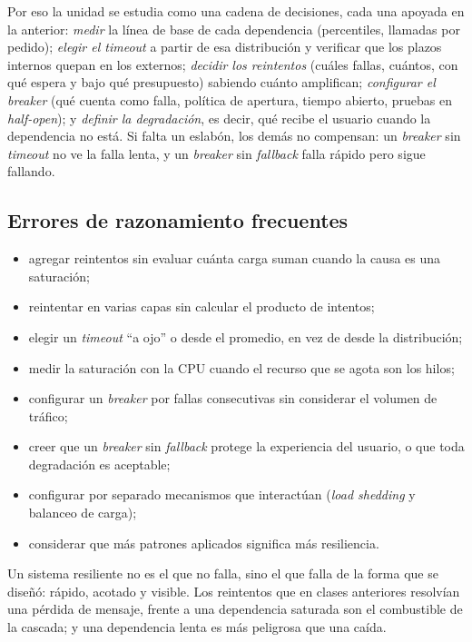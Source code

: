 \documentclass[variant=apuntes,cover=institutional,mode=screen]{ua-engineering-v6-article}
\begin{document}
Por eso la unidad se estudia como una cadena de decisiones, cada una apoyada en la anterior: \emph{medir} la línea de base de cada dependencia (percentiles, llamadas por pedido); \emph{elegir el timeout} a partir de esa distribución y verificar que los plazos internos quepan en los externos; \emph{decidir los reintentos} (cuáles fallas, cuántos, con qué espera y bajo qué presupuesto) sabiendo cuánto amplifican; \emph{configurar el breaker} (qué cuenta como falla, política de apertura, tiempo abierto, pruebas en \emph{half-open}); y \emph{definir la degradación}, es decir, qué recibe el usuario cuando la dependencia no está. Si falta un eslabón, los demás no compensan: un \emph{breaker} sin \emph{timeout} no ve la falla lenta, y un \emph{breaker} sin \emph{fallback} falla rápido pero sigue fallando.

\subsection*{Errores de razonamiento frecuentes}
\begin{itemize}
\item agregar reintentos sin evaluar cuánta carga suman cuando la causa es una saturación;
\item reintentar en varias capas sin calcular el producto de intentos;
\item elegir un \emph{timeout} ``a ojo'' o desde el promedio, en vez de desde la distribución;
\item medir la saturación con la CPU cuando el recurso que se agota son los hilos;
\item configurar un \emph{breaker} por fallas consecutivas sin considerar el volumen de tráfico;
\item creer que un \emph{breaker} sin \emph{fallback} protege la experiencia del usuario, o que toda degradación es aceptable;
\item configurar por separado mecanismos que interactúan (\emph{load shedding} y balanceo de carga);
\item considerar que más patrones aplicados significa más resiliencia.
\end{itemize}

\begin{uakeybox}
Un sistema resiliente no es el que no falla, sino el que falla de la forma que se diseñó: rápido, acotado y visible. Los reintentos que en clases anteriores resolvían una pérdida de mensaje, frente a una dependencia saturada son el combustible de la cascada; y una dependencia lenta es más peligrosa que una caída.
\end{uakeybox}
\end{document}
